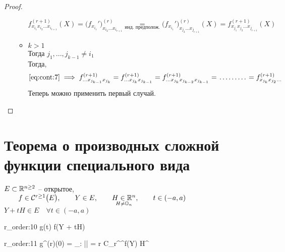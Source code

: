 \begin{proof}
\begin{itemize}
\begin{itemize}
			$$ f_{x_{i_1}x_{i_2}...x_{i_{r + 1}}}^{(r + 1)}(X) = \bigg( f_{x_{i_1}}' \bigg)_{x_{i_2}...x_{i_{r + 1}}}^{(r)} \underset{\text{инд. предполож.}}= \bigg( f_{x_{i_1}}' \bigg)^{(r)}_{x_{j_2}...x_{j_{r + 1}}}(X) = f_{x_{j_1}x_{j_2}...x_{j_{r + 1}}}^{(r + 1)}(X) $$
			\item $ k > 1 $ \\
			Тогда $ j_1, ..., j_{k - 1} \ne i_1 $ \\
			Тогда,
			$$ \eref{cont:7} \implies f_{...x_{j_{k - 1}}x_{j_k}}^{(r + 1)} = f_{...x_{j_k}x_{j_{k - 1}}}^{(r + 1)} = f_{...x_{j_k}x_{j_{k - 2}}x_{j_{k - 1}}}^{(r + 1)} = \widedots[4em] = f_{x_{j_k}x_{j_2}...}^{(r + 1)} $$
			Теперь можно применить первый случай.
		\end{itemize}
	\end{itemize}
\end{proof}

\section{Теорема о производных сложной функции специального вида}
\begin{theorem}
	$ E \sub \R^{n \ge 2} $ -- открытое, $ \qquad f \in \Cont[r \ge 1]{E}, \qquad Y \in E, \qquad \underset{H \ne \On}{H \in \R^n}, \qquad t \in (-a, a) $ \\
	$ Y + tH \in E \quad \forall t \in (-a, a) $
	\begin{equ}{r_order:10}
		g(t)  f(Y + tH)
	\end{equ}
	\begin{equ}{r_order:11}
		\implies g^{(r)}(0) = \sum_{\alpha : |\alpha| = r} C_r^\alpha \partial^\alpha f(Y) H^\alpha
	\end{equ}
\end{theorem}


